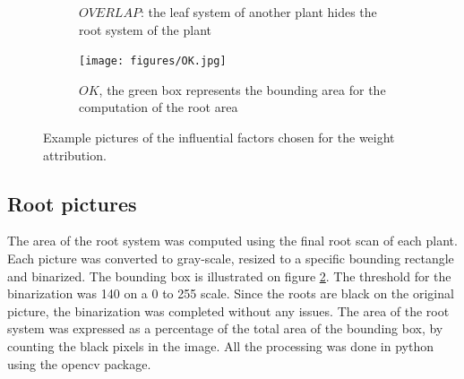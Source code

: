 \begin{figure}
\begin{subfigure}[b]{.13\textwidth}
  \caption{$OVERLAP$: the leaf system of another plant hides the root system of the plant}
  \label{fig:OVERLAP}
\end{subfigure}
%
\begin{subfigure}[b]{.13\textwidth}
  \centering
  \texttt{[image: figures/OK.jpg]}
  \caption{$OK$, the green box represents the bounding area for the computation of the root area}
  \label{fig:OK}
\end{subfigure}
%
\caption{Example pictures of the influential factors chosen for the weight attribution.}
\label{fig:example_influential_factors}
\end{figure}

\subsection{Root pictures}
The area of the root system was computed using the final root scan of each plant. Each picture was converted to gray-scale, resized to a specific bounding rectangle and binarized. The bounding box is illustrated on figure \ref{fig:OK}. The threshold for the binarization was 140 on a 0 to 255 scale. Since the roots are black on the original picture, the binarization was completed without any issues. The area of the root system was expressed as a percentage of the total area of the bounding box, by counting the black pixels in the image. All the processing was done in python using the opencv package.


